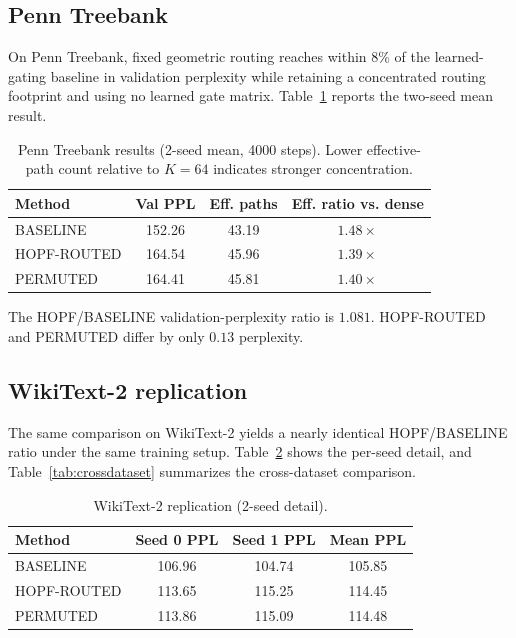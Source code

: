 \documentclass[10pt,twocolumn]{article}
\begin{document}
\subsection{Penn Treebank}
On Penn Treebank, fixed geometric routing reaches within 8\% of the learned-gating baseline in validation perplexity while retaining a concentrated routing footprint and using no learned gate matrix. Table~\ref{tab:ptb} reports the two-seed mean result.

\begin{table}[t]
\centering
\caption{Penn Treebank results (2-seed mean, 4000 steps). Lower effective-path count relative to $K=64$ indicates stronger concentration.}
\label{tab:ptb}
\small
\begin{tabular}{lccc}
\toprule
Method & Val PPL & Eff. paths & Eff. ratio vs. dense \\
\midrule
BASELINE & 152.26 & 43.19 & $1.48\times$ \\
HOPF-ROUTED & 164.54 & 45.96 & $1.39\times$ \\
PERMUTED & 164.41 & 45.81 & $1.40\times$ \\
\bottomrule
\end{tabular}
\end{table}

The HOPF/BASELINE validation-perplexity ratio is $1.081$. HOPF-ROUTED and PERMUTED differ by only $0.13$ perplexity.

\subsection{WikiText-2 replication}
The same comparison on WikiText-2 yields a nearly identical HOPF/BASELINE ratio under the same training setup. Table~\ref{tab:wt2} shows the per-seed detail, and Table~\ref{tab:crossdataset} summarizes the cross-dataset comparison.

\begin{table}[t]
\centering
\caption{WikiText-2 replication (2-seed detail).}
\label{tab:wt2}
\small
\begin{tabular}{lccc}
\toprule
Method & Seed 0 PPL & Seed 1 PPL & Mean PPL \\
\midrule
BASELINE & 106.96 & 104.74 & 105.85 \\
HOPF-ROUTED & 113.65 & 115.25 & 114.45 \\
PERMUTED & 113.86 & 115.09 & 114.48 \\
\bottomrule
\end{tabular}
\end{table}
\end{document}
